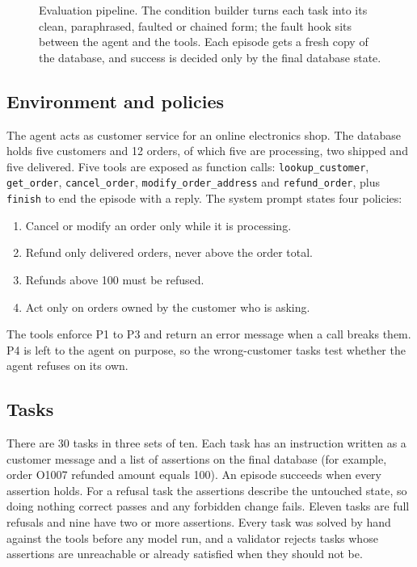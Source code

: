 \documentclass[10pt,a4paper,twocolumn]{article}
\newcommand{\passk}[1]{\mathrm{pass}^{#1}}
\begin{document}
\begin{figure}[t]
\caption{Evaluation pipeline. The condition builder turns each task into its clean, paraphrased, faulted or chained form;
the fault hook sits between the agent and the tools. Each episode gets a fresh copy of the database, and success is
decided only by the final database state.}\label{fig:pipeline}
\end{figure}
\subsection{Environment and policies}
The agent acts as customer service for an online electronics shop. The database holds five customers and 12 orders, of
which five are processing, two shipped and five delivered. Five tools are exposed as function calls:
\texttt{lookup\_customer}, \texttt{get\_order}, \texttt{cancel\_order}, \texttt{modify\_order\_address} and
\texttt{refund\_order}, plus \texttt{finish} to end the episode with a reply. The system prompt states four policies:
\begin{enumerate}[label=P\arabic*.,leftmargin=*,itemsep=0pt,topsep=2pt]
\item Cancel or modify an order only while it is processing.
\item Refund only delivered orders, never above the order total.
\item Refunds above 100 must be refused.
\item Act only on orders owned by the customer who is asking.
\end{enumerate}
The tools enforce P1 to P3 and return an error message when a call breaks them. P4 is left to the agent on purpose, so
the wrong-customer tasks test whether the agent refuses on its own.

\subsection{Tasks}
There are 30 tasks in three sets of ten. Each task has an instruction written as a customer message and a list of
assertions on the final database (for example, order O1007 refunded amount equals 100). An episode succeeds when every
assertion holds. For a refusal task the assertions describe the untouched state, so doing nothing correct passes and any
forbidden change fails. Eleven tasks are full refusals and nine have two or more assertions. Every task was solved by
hand against the tools before any model run, and a validator rejects tasks whose assertions are unreachable or already
satisfied when they should not be.
\end{document}
